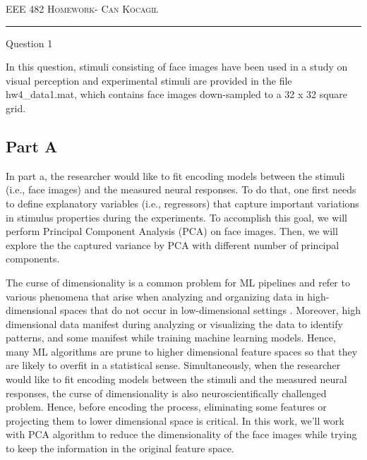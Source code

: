 \documentclass[12pt]{amsart}
\makeatletter
\def\section{\@startsection{section}{1}%
  \z@{.7\linespacing\@plus\linespacing}{.5\linespacing}%
  {\normalfont\scshape}}%
\makeatother
\begin{document}
\newpage
\listoffigures
\bigskip
\listoftables


\newpage
{\scshape EEE 482} \hfill {\scshape \large  Homework-\relax} \hfill {\scshape Can Kocagil}
\smallskip
\hrule
\vspace{2mm}


\section{Question 1}

In this question, stimuli consisting of face images have been used in a study on visual perception and experimental stimuli are provided in the file hw4\_data1.mat, which contains face images down-sampled to a 32 x 32 square grid.

\subsection{Part A}

In part a, the researcher would like to fit encoding models between the stimuli (i.e., face images) and the measured neural responses. To do that, one first needs to define explanatory variables (i.e., regressors) that capture important variations in stimulus properties during the experiments. To accomplish this goal, we will perform Principal Component Analysis (PCA) on face images. Then, we will explore the the captured variance by PCA with different number of principal components.

\bigskip

The curse of dimensionality is a common problem for ML pipelines and refer to various phenomena that arise when analyzing and organizing data in high-dimensional spaces that do not occur in low-dimensional settings \cite{enwiki:1009164221}. Moreover, high dimensional data manifest during analyzing or visualizing the data to identify patterns, and some manifest while training machine learning models. Hence, many ML algorithms are prune to higher dimensional feature spaces so that they are likely to overfit in a statistical sense. Simultaneously, when the researcher would like to fit encoding models between the stimuli and the measured neural responses, the curse of dimensionality is also  neuroscientifically challenged problem. Hence, before encoding the process, eliminating some features or projecting them to lower dimensional space is critical. In this work, we'll work with PCA algorithm to reduce the dimensionality of the face images while trying to keep the information in the original feature space.
\end{document}
